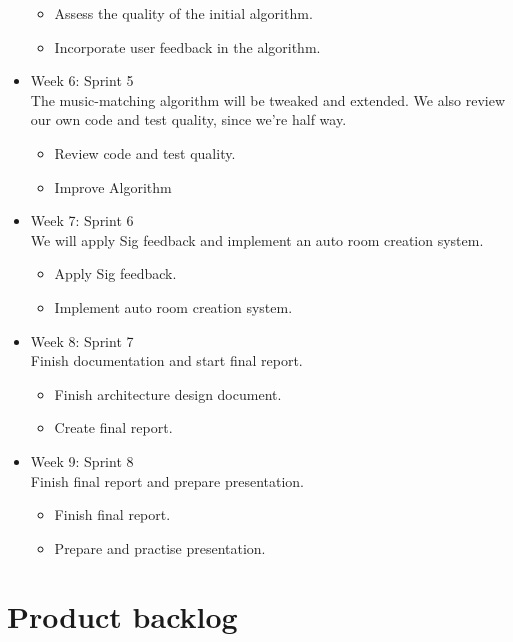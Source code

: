 \begin{itemize}
\begin{itemize}
\item Assess the quality of the initial algorithm.
\item Incorporate user feedback in the algorithm.
\end{itemize}

\item Week 6: Sprint 5\\
The music-matching algorithm will be tweaked and extended. We also review our own code and test quality, since we're half way.

\begin{itemize}
\item Review code and test quality.
\item Improve Algorithm
\end{itemize}

\item Week 7: Sprint 6\\
We will apply Sig feedback and implement an auto room creation system.

\begin{itemize}
\item Apply Sig feedback.
\item Implement auto room creation system.
\end{itemize}

\item Week 8: Sprint 7\\
Finish documentation and start final report.

\begin{itemize}
\item Finish architecture design document.
\item Create final report.
\end{itemize}


\item Week 9: Sprint 8\\
Finish final report and prepare presentation.

\begin{itemize}
\item Finish final report.
\item Prepare and practise presentation.
\end{itemize}


\end{itemize}

\chapter{Product backlog}

